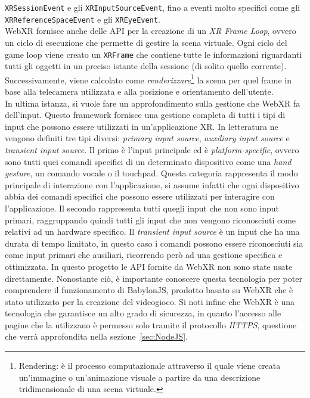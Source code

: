 \texttt{XRSessionEvent} e gli \texttt{XRInputSourceEvent}, fino a eventi molto specifici come gli \texttt{XRReferenceSpaceEvent} e gli \texttt{XREyeEvent}.\\
WebXR fornisce anche delle API per la creazione di un \textit{XR Frame Loop}, ovvero un ciclo di esecuzione che permette di gestire la scena virtuale. Ogni
ciclo del game loop viene creato un \texttt{XRFrame} che contiene tutte le informazioni riguardanti tutti gli oggetti in un preciso istante della sessione (di solito quello corrente).
Successivamente, viene calcolato come \textit{renderizzare}\footnote{Rendering: è il processo computazionale attraverso il quale viene creata un'immagine o un'animazione visuale a 
partire da una descrizione tridimensionale di una scena virtuale.} la scena per quel frame in base alla telecamera utilizzata e alla posizione e orientamento dell'utente.\\
\newline
In ultima istanza, si vuole fare un approfondimento sulla gestione che WebXR fa dell'input. Questo framework fornisce una gestione completa di tutti i tipi di input che possono
essere utilizzati in un'applicazione XR. In letteratura ne vengono definiti tre tipi diversi: \textit{primary input source}, \textit{auxiliary input source} e \textit{transient
input source}. Il primo è l'input principale ed è \textit{platform-specific}, ovvero sono tutti quei comandi specifici di un determinato dispositivo come una \textit{hand gesture},
un comando vocale o il touchpad. Questa categoria rappresenta il modo principale di interazione con l'applicazione, si assume infatti che ogni dispositivo abbia dei comandi specifici
che possono essere utilizzati per interagire con l'applicazione. Il secondo rappresenta tutti quegli input che non sono input primari, raggruppando quindi tutti gli input
che non vengono riconosciuti come relativi ad un hardware specifico. Il \textit{transient input source} è un input che ha una durata di tempo limitato, in questo caso i comandi
possono essere riconosciuti sia come input primari che ausiliari, ricorrendo però ad una gestione specifica e ottimizzata.
\newline \newline
In questo progetto le API fornite da WebXR non sono state usate direttamente. Nonostante ciò, è importante conoscere questa tecnologia per poter comprendere il funzionamento
di BabylonJS, prodotto basato su WebXR che è stato utilizzato per la creazione del videogioco. Si noti infine che WebXR è una tecnologia che garantisce un alto grado di sicurezza, in quanto l'accesso alle pagine che la utilizzano è permesso solo tramite il protocollo \textit{HTTPS}, questione che verrà approfondita nella sezione~\ref{sec:NodeJS}. 

